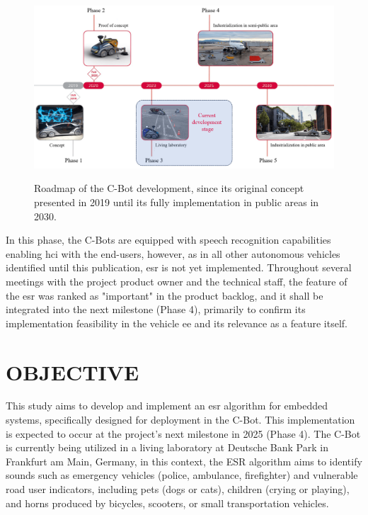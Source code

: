 \begin{figure}[htbp]
    \raggedright
        \caption{Roadmap of the C-Bot development, since its original concept presented in 2019 until its fully implementation in public areas in 2030.}
        \includegraphics[width=1\textwidth]{resources/images/020-introduction/Introduction_context_C-Bot_roadmap.png}
        \label{fig:introduction_C-Bot_roadmap}
\end{figure} 

In this phase, the C-Bots are equipped with speech recognition capabilities enabling \gls{hci} with the end-users, however, as in all other autonomous vehicles identified until this publication, \gls{esr} is not yet implemented. Throughout several meetings with the project product owner and the technical staff, the feature of the \gls{esr} was ranked as "important" in the product backlog, and it shall be integrated into the next milestone (Phase 4), primarily to confirm its implementation feasibility in the vehicle \gls{ee} and its relevance as a feature itself.


\section{OBJECTIVE}
\label{sec:introduction_objective}

This study aims to develop and implement an \gls{esr}  algorithm for embedded systems, specifically designed for deployment in the C-Bot. This implementation is expected to occur at the project's next milestone in 2025 (Phase 4). The C-Bot is currently being utilized in a living laboratory at Deutsche Bank Park in Frankfurt am Main, Germany, in this context, the ESR algorithm aims to identify sounds such as emergency vehicles (police, ambulance, firefighter) and vulnerable road user indicators, including pets (dogs or cats), children (crying or playing), and horns produced by bicycles, scooters, or small transportation vehicles.


